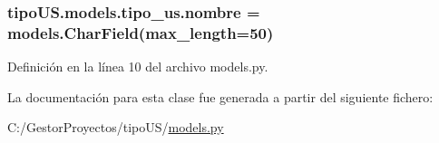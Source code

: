 \subsubsection[{\texorpdfstring{nombre}{nombre}}]{\setlength{\rightskip}{0pt plus 5cm}tipo\+U\+S.\+models.\+tipo\+\_\+us.\+nombre = models.\+Char\+Field(max\+\_\+length=50)\hspace{0.3cm}{\ttfamily [static]}}\hypertarget{classtipo_u_s_1_1models_1_1tipo__us_afc502ae2c26fb38390d35a9cff37e851}{}\label{classtipo_u_s_1_1models_1_1tipo__us_afc502ae2c26fb38390d35a9cff37e851}


Definición en la línea 10 del archivo models.\+py.



La documentación para esta clase fue generada a partir del siguiente fichero\+:\begin{DoxyCompactItemize}
\item 
C\+:/\+Gestor\+Proyectos/tipo\+U\+S/\hyperlink{tipo_u_s_2models_8py}{models.\+py}\end{DoxyCompactItemize}
